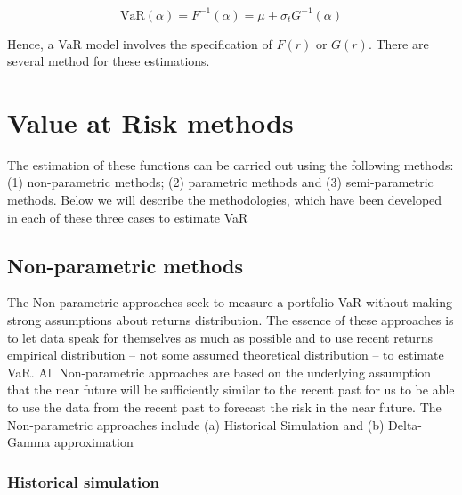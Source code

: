 \documentclass[a4paper,11pt,oneside]{book}
\begin{document}
\begin{equation}
\text{VaR} (\alpha) = F^{-1}(\alpha) = \mu + \sigma_tG^{-1}(\alpha)
\label{2}
\end{equation}

Hence, a VaR model involves the specification of $F(r)$ or $G(r)$. There are several method for these estimations.





\section{Value at Risk methods}
The estimation of these functions can be carried out using the
following methods: (1) non-parametric methods; (2) parametric
methods and (3) semi-parametric methods. Below we will describe
the methodologies, which have been developed in each of these
three cases to estimate VaR
\subsection{Non-parametric methods}
The Non-parametric approaches seek to measure a portfolio VaR
without making strong assumptions about returns distribution. The
essence of these approaches is to let data speak for themselves as
much as possible and to use recent returns empirical distribution
– not some assumed theoretical distribution – to estimate VaR.
All Non-parametric approaches are based on the underlying
assumption that the near future will be sufficiently similar to the
recent past for us to be able to use the data from the recent past to
forecast the risk in the near future.
The Non-parametric approaches include (a) Historical Simulation
and (b) Delta-Gamma approximation
\subsubsection{Historical simulation}
\end{document}

